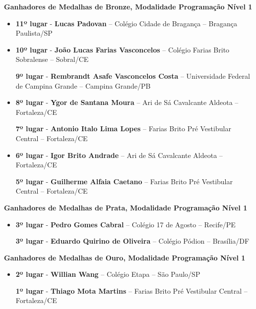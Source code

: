 \documentclass{article}
\begin{document}
\textbf{\color{blue}Ganhadores de Medalhas de Bronze, \color{black}Modalidade Programação Nível 1}
\color{black}

\begin{itemize}
\item
\textbf{11º lugar} - \textbf{Lucas Padovan} – Colégio Cidade de Bragança – Bragança Paulista/SP



\item
\textbf{10º lugar} - \textbf{João Lucas Farias Vasconcelos} – Colégio Farias Brito Sobralense – Sobral/CE


\textbf{9º lugar} - \textbf{Rembrandt Asafe Vasconcelos Costa} – Universidade Federal de Campina Grande – Campina Grande/PB



\item
\textbf{8º lugar} - \textbf{Ygor de Santana Moura} – Ari de Sá Cavalcante Aldeota – Fortaleza/CE


\textbf{7º lugar} - \textbf{Antonio Italo Lima Lopes} – Farias Brito Pré Vestibular Central – Fortaleza/CE



\item
\textbf{6º lugar} - \textbf{Igor Brito Andrade} – Ari de Sá Cavalcante Aldeota – Fortaleza/CE


\textbf{5º lugar} - \textbf{Guilherme Alfaia Caetano} – Farias Brito Pré Vestibular Central – Fortaleza/CE



\end{itemize}

\textbf{\color{blue}Ganhadores de Medalhas de Prata, \color{black}Modalidade Programação Nível 1}
\color{black}

\begin{itemize}
\item
\textbf{3º lugar} - \textbf{Pedro Gomes Cabral} – Colégio 17 de Agosto – Recife/PE


\textbf{3º lugar} - \textbf{Eduardo Quirino de Oliveira} – Colégio Pódion – Brasília/DF



\end{itemize}

\textbf{\color{blue}Ganhadores de Medalhas de Ouro, \color{black}Modalidade Programação Nível 1}
\color{black}

\begin{itemize}
\item
\textbf{2º lugar} - \textbf{Willian Wang} – Colégio Etapa – São Paulo/SP


\textbf{1º lugar} - \textbf{Thiago Mota Martins} – Farias Brito Pré Vestibular Central – Fortaleza/CE



\end{itemize}
\end{document}
